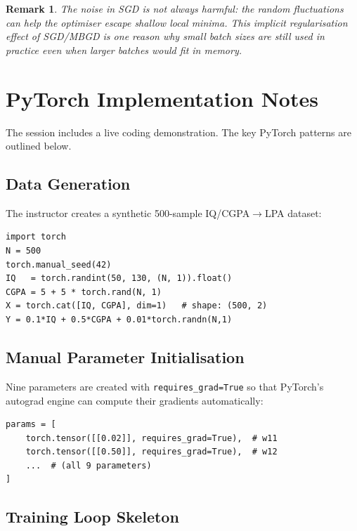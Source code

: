 \documentclass[12pt,a4paper]{article}
\newtheorem{remark}{Remark}[section]
\begin{document}
\begin{remark}
\label{rem:sgd-escape}
The noise in SGD is not always harmful: the random fluctuations can help
the optimiser escape shallow local minima.
This \emph{implicit regularisation} effect of SGD/MBGD is one reason why
small batch sizes are still used in practice even when larger batches would
fit in memory.
\end{remark}

\section{PyTorch Implementation Notes}
\label{sec:pytorch}

The session includes a live coding demonstration.
The key PyTorch patterns are outlined below.

\subsection{Data Generation}

The instructor creates a synthetic 500-sample IQ/CGPA$\to$LPA dataset:

\begin{verbatim}
import torch
N = 500
torch.manual_seed(42)
IQ   = torch.randint(50, 130, (N, 1)).float()
CGPA = 5 + 5 * torch.rand(N, 1)
X = torch.cat([IQ, CGPA], dim=1)   # shape: (500, 2)
Y = 0.1*IQ + 0.5*CGPA + 0.01*torch.randn(N,1)
\end{verbatim}

\subsection{Manual Parameter Initialisation}

Nine parameters are created with \texttt{requires\_grad=True} so that
PyTorch's autograd engine can compute their gradients automatically:

\begin{verbatim}
params = [
    torch.tensor([[0.02]], requires_grad=True),  # w11
    torch.tensor([[0.50]], requires_grad=True),  # w12
    ...  # (all 9 parameters)
]
\end{verbatim}

\subsection{Training Loop Skeleton}
\end{document}
